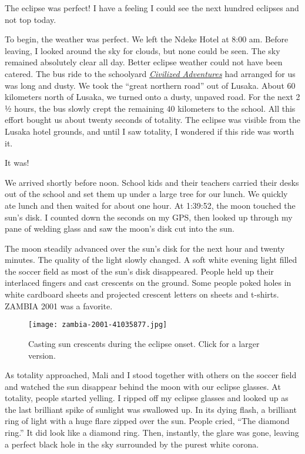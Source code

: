 The eclipse was perfect! I have a feeling I could see the next hundred
eclipses and not top today.

To begin, the weather was perfect. We left the Ndeke Hotel at 8:00 am.
Before leaving, I looked around the sky for clouds, but none could be
seen. The sky remained absolutely clear all day. Better eclipse weather
could not have been catered. The bus ride to the schoolyard
\emph{\href{https://ca.linkedin.com/company/civilized-adventures}{Civilized
Adventures}} had arranged for us was long and dusty. We took the ``great
northern road'' out of Lusaka. About 60 kilometers north of Lusaka, we
turned onto a dusty, unpaved road. For the next 2 ½ hours, the bus
slowly crept the remaining 40 kilometers to the school. All this effort
bought us about twenty seconds of totality. The eclipse was visible from
the Lusaka hotel grounds, and until I saw totality, I wondered if this
ride was worth it.

It was!

We arrived shortly before noon. School kids and their teachers carried
their desks out of the school and set them up under a large tree for our
lunch. We quickly ate lunch and then waited for about one hour. At
1:39:52, the moon touched the sun's disk. I counted down the seconds on
my GPS, then looked up through my pane of welding glass and saw the
moon's disk cut into the sun.

The moon steadily advanced over the sun's disk for the next hour and
twenty minutes. The quality of the light slowly changed. A soft white
evening light filled the soccer field as most of the sun's disk
disappeared. People held up their interlaced fingers and cast crescents
on the ground. Some people poked holes in white cardboard sheets and
projected crescent letters on sheets and t-shirts. ZAMBIA 2001 was a
favorite.

\begin{figure}
\centering
\texttt{[image: zambia-2001-41035877.jpg]}
\caption{Casting sun crescents during the eclipse onset. Click for a
larger version.}
\end{figure}

As totality approached, Mali and I stood together with others on the
soccer field and watched the sun disappear behind the moon with our
eclipse glasses. At totality, people started yelling. I ripped off my
eclipse glasses and looked up as the last brilliant spike of sunlight
was swallowed up. In its dying flash, a brilliant ring of light with a
huge flare zipped over the sun. People cried, ``The diamond ring.'' It
did look like a diamond ring. Then, instantly, the glare was gone,
leaving a perfect black hole in the sky surrounded by the purest white
corona.

